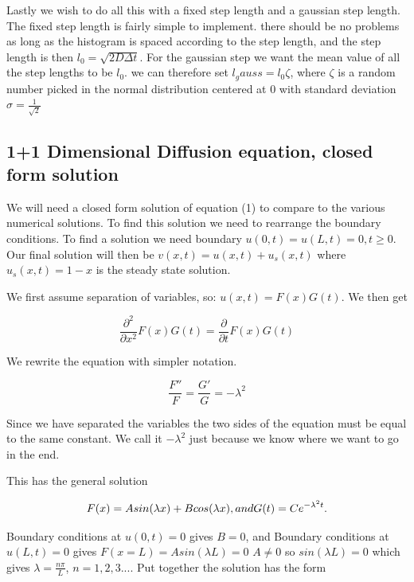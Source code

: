 \documentclass[english,a4paper,12pt]{article}
\begin{document}
Lastly we wish to do all this with a fixed step length and a gaussian step length. The fixed step length is fairly simple to implement.
there should be no problems as long as the histogram is spaced according to the step length, and the step length is then
$l_0 = \sqrt{2D\Delta{t}}$. For the gaussian step we want the mean value of all the step lengths to be $l_0$. we can therefore set
$l_gauss = l_0\zeta$, where $\zeta$ is a random number picked in the normal distribution centered at $0$ with standard deviation $\sigma = \frac{1}{\sqrt{2}}$

\subsection*{1+1 Dimensional Diffusion equation, closed form solution}

We will need a closed form solution of equation (1) to compare to the various numerical solutions. To find this solution we need 
to rearrange the boundary conditions. To find a solution we need boundary $u(0,t) = u(L,t) = 0, t \geq 0$. 
Our final solution will then be $v(x,t) = u(x,t) + u_{s}(x,t)$ where $u_{s}(x,t) = 1-x$ is the steady state solution.

We first assume separation of variables, so: $u(x,t) = F(x)G(t)$. We then get

\begin{equation}
 \frac{\partial^2}{\partial x^2} F(x)G(t) = \frac{\partial}{\partial t} F(x)G(t)
\end{equation}

We rewrite the equation with simpler notation.

\begin{equation}
 \frac{F''}{F} = \frac{G'}{G} = -\lambda^2
\end{equation}

Since we have separated the variables the two sides of the equation must be equal to the same constant. We call it $-\lambda^2$ 
just because we know where we want to go in the end.

This has the general solution

\begin{equation}
 F(x) = A sin(\lambda x) + B cos(\lambda x),\space and \space G(t) = Ce^{-\lambda^2 t}.
\end{equation}

Boundary conditions at $u(0,t) = 0$ gives $B = 0$, and Boundary conditions at $u(L,t) = 0$ gives $F(x=L) = A sin(\lambda L) = 0$
$A \neq 0$ so $sin(\lambda L) = 0$ which gives $\lambda = \frac{n \pi}{L}$, $n = 1, 2, 3...$. Put together the solution has the form
\end{document}
